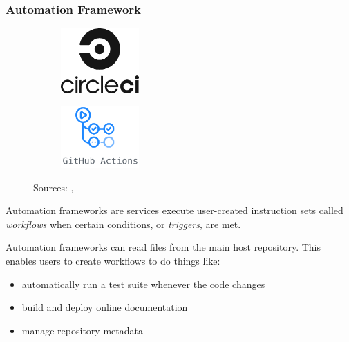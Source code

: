 \begin{frame}[t]
    \frametitle{Automation Framework}
    \begin{figure}[htpb]
        \begin{subfigure}
            \centering
            \includegraphics[width=3cm]{images/circleci-logo.png}
        \end{subfigure}
        \hspace{1cm}
        \begin{subfigure}
            \centering
            \includegraphics[width=3cm]{images/github-actions-logo.png}
        \end{subfigure}
        \newline
        {\tiny Sources: \cite{circle_ci_logo}, \cite{github_actions_logo}}
    \end{figure}

    Automation frameworks are services execute user-created instruction sets called {\it workflows} when certain conditions, or {\it triggers}, are met.

    Automation frameworks can read files from the main host repository. This enables users to create workflows to do things like:
    \begin{itemize}
        \item automatically run a test suite whenever the code changes
        \item build and deploy online documentation
        \item manage repository metadata
    \end{itemize}
    
\end{frame}

